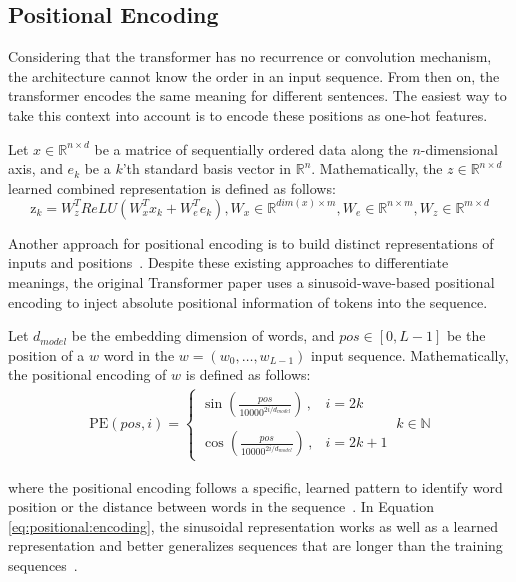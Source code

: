 \subsection{Positional Encoding}
\label{subsec:transformer:positional:encoding}

Considering that the transformer has no recurrence or convolution mechanism, the
architecture cannot know the order in an input sequence. From then on, the
transformer encodes the same meaning for different sentences. The easiest way to
take this context into account is to encode these positions as one-hot features.
\begin{definition}
  Let $x \in \mathbb{R}^{n \times d}$ be a matrice of sequentially ordered data
  along the $n$-dimensional axis, and $e_k$ be a $k$'th standard basis vector in
  $\mathbb{R}^n$. Mathematically, the $z \in \mathbb{R}^{n \times d}$ learned
  combined representation is defined as follows:
  \begin{equation}
    \mathrm{z}_k = W^T_zReLU\left(W_x^Tx_k + W_e^Te_k\right), W_x \in
    \mathbb{R}^{dim(x)\times m}, W_e \in \mathbb{R}^{n\times m}, W_z \in \mathbb{R}^{m\times d}
    \label{eq:def:positional:encoding:one:hot}
  \end{equation}
  \label{def:positional:encoding:one:hot}
\end{definition}

\noindent Another approach for positional encoding is to build distinct
representations of inputs and positions~\citep{gehring}. Despite these existing
approaches to differentiate meanings, the original Transformer paper uses a
sinusoid-wave-based positional encoding to inject absolute positional
information of tokens into the sequence.

\begin{definition}
  Let $d_{model}$ be the embedding dimension of words, and $pos \in \left[0, L -
    1\right]$ be the position of a $w$ word in the $w = (w_0,\dotsc,w_{L-1})$ input
  sequence. Mathematically, the positional encoding of $w$ is defined as follows:
  \begin{align}
    \mathrm{PE}(pos,i) = \begin{cases}
      \sin\displaystyle\left(\frac{pos}{10000^{2i/d_{model}}}\right)\,, & i = 2k \\\\
      \cos\displaystyle{\left(\frac{pos}{10000^{2i/d_{model}}}\right)}\,, & i = 2k + 1
    \end{cases} \   k \in \mathbb{N}
    \label{eq:positional:encoding}
  \end{align}

  where the positional encoding follows a specific, learned pattern to identify
  word position or the distance between words in the sequence~\citep{alammar}.  In
  Equation \ref{eq:positional:encoding}, the sinusoidal representation works as
  well as a learned representation and better generalizes sequences that are
  longer than the training sequences~\citep{vaswani:attention}.
\end{definition}

